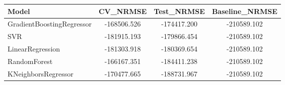 \begin{tabular}{|l|c|c|c|}
\toprule
Model & CV\_NRMSE & Test\_NRMSE & Baseline\_NRMSE \\
\midrule
GradientBoostingRegressor & -168506.526 & -174417.200 & -210589.102 \\
SVR & -181915.193 & -179866.454 & -210589.102 \\
LinearRegression & -181303.918 & -180369.654 & -210589.102 \\
RandomForest & -166167.351 & -184411.238 & -210589.102 \\
KNeighborsRegressor & -170477.665 & -188731.967 & -210589.102 \\
\bottomrule
\end{tabular}
